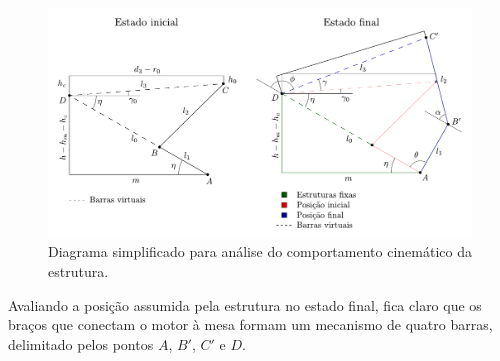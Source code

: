 \documentclass[12pt]{article}
\begin{document}
	\begin{figure}[H]
		\centering
		\includegraphics[width=1\linewidth]{figuras/diagramaSimples.pdf}
		\caption{Diagrama simplificado para análise do comportamento cinemático da estrutura.}
		\label{diagramaSimples}
	\end{figure}
	
	Avaliando a posição assumida pela estrutura no estado final, fica claro que os braços que conectam o motor à mesa formam um mecanismo de quatro barras, delimitado pelos pontos $ A $, $ B' $, $ C' $ e $ D $.
	
\end{document}
